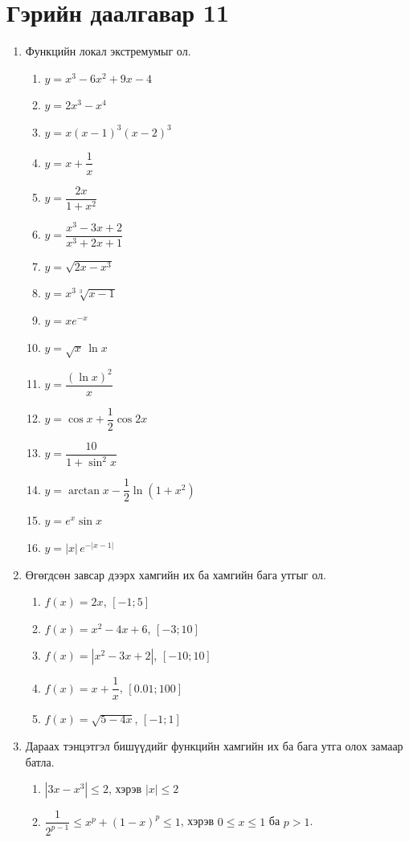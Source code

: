 \section{Гэрийн даалгавар 11}
\begin{enumerate}
  \item Функцийн локал экстремумыг ол.
  \begin{enumerate}
  \item  $y = x^3 - 6x^2 + 9x - 4$ 
  \item $y = 2x^3 - x^4$ 
  \item $y = x(x-1)^3(x-2)^3$ 
  \item $y = x + \dfrac{1}{x}$ 
  \item $y = \dfrac{2x}{1+x^2}$ 
  \item $y = \dfrac{x^3 - 3x + 2}{x^3 + 2x + 1}$ 
  \item $y = \sqrt{2x - x^3}$ 
  \item $y = x^3\sqrt[3]{x - 1}$ 
  \item $y = x e^{-x}$
  \item $y = \sqrt{x}\,\ln x$ 
  \item $y = \dfrac{(\ln x)^2}{x}$
  \item $y = \cos x + \dfrac{1}{2}\cos 2x$ 
  \item $y = \dfrac{10}{1 + \sin^2 x}$ 
  \item $y = \arctan x - \dfrac{1}{2}\ln(1 + x^2)$ 
  \item $y = e^x \sin x$ 
  \item $y = |x|\, e^{-|x-1|}$
  \end{enumerate}
\item Өгөгдсөн завсар дээрх хамгийн их ба хамгийн бага утгыг ол.
  \begin{enumerate}
  \item  $f(x) = 2x$, $[-1; 5]$ 
  \item $f(x) = x^2 - 4x + 6$, $[-3; 10]$ 
  \item $f(x) = |x^2 - 3x + 2|$, $[-10; 10]$ 
  \item $f(x) = x + \dfrac{1}{x}$, $[0.01; 100]$ 
  \item $f(x) = \sqrt{5 - 4x}$, $[-1; 1]$ 
  \end{enumerate}
\item Дараах тэнцэтгэл бишүүдийг функцийн хамгийн их ба бага утга олох замаар батла.
   \begin{enumerate}
   \item $|3x - x^3| \le 2$, хэрэв $|x| \le 2$
   \item $\dfrac{1}{2^{p-1}} \le x^p + (1-x)^p \le 1$, хэрэв $0 \le x \le 1$ ба $p>1$.

\end{enumerate}
\end{enumerate}
